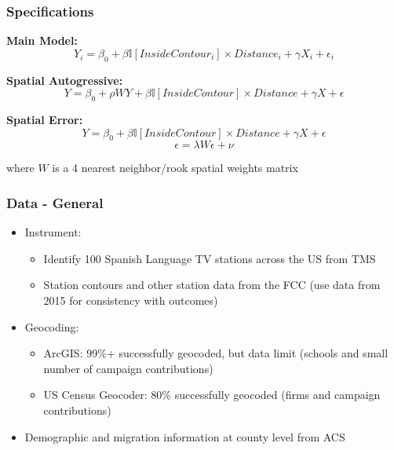 \documentclass{beamer}
\begin{document}
\begin{frame}
\frametitle{Specifications}

\textbf{Main Model:}
\[ Y_i^{} = \beta_0 + \beta \mathbb{I}[InsideContour_i] \times Distance_i + \gamma X_i + \epsilon_i \]

\textbf{Spatial Autogressive:}
\[ Y = \beta_0 + \rho W Y + \beta \mathbb{I}[InsideContour] \times Distance + \gamma X + \epsilon \]

\textbf{Spatial Error:}
\[ Y = \beta_0 + \beta \mathbb{I}[InsideContour] \times Distance + \gamma X + \epsilon \]
\[\epsilon = \lambda W \epsilon + \nu\]

where $W$ is a 4 nearest neighbor/rook spatial weights matrix

\end{frame}

\begin{frame}
\frametitle{Data - General}

\begin{itemize}
\item Instrument:
\begin{itemize}
\item Identify 100 Spanish Language TV stations across the US from TMS
\item Station contours and other station data from the FCC (use data from 2015 for consistency with outcomes)
\end{itemize}
\item Geocoding:
\begin{itemize}
\item ArcGIS: 99\%+ successfully geocoded, but data limit (schools and small number of campaign contributions)
\item US Census Geocoder: 80\% successfully geocoded (firms and campaign contributions)
\end{itemize}
\item Demographic and migration information at county level from ACS
\end{itemize}

\end{frame}
\end{document}
